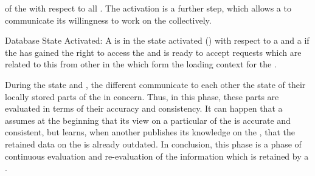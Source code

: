 \documentclass[a4paper, 12pt]{book}
\begin{document}
of the  with respect to all . 
%
The activation is a further step, which allows a  to
communicate its willingness to work on the 
collectively. 
%
\begin{definition*}{Database State Activated: \dbstateACTIVATED}
  A  is in the state activated (\dbstateACTIVATED) with
  respect to a  and a  if the 
  has gained the right to access the  and is ready to accept
  requests which are related to this  from other
   in the  which form the loading context
  for the .
\end{definition*}

During the state \dbstateLOADED and \dbstateACTIVATED, the different
 communicate to each other the state of their locally
stored parts of the  in concern. Thus, in this phase,
these parts are evaluated in terms of their accuracy and
consistency. It can happen that a  assumes at the
beginning that its view on a particular  of the
 is accurate and consistent, but learns, when another
 publishes its knowledge on the , that the
retained data on the  is already outdated. In conclusion,
this phase is a phase of continuous evaluation and re-evaluation of
the information which is retained by a .
%
\end{document}
